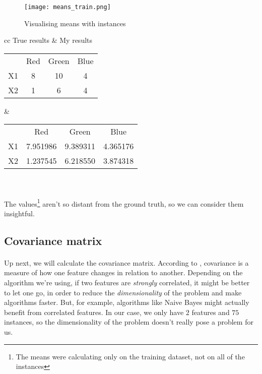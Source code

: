 \begin{figure}[H]
    \centering
    \texttt{[image: means\_train.png]}
    \caption{Visualising means with instances}
    \label{}
\end{figure}

\clearpage

\begin{center}
    \begin{tabular}{ cc }   %
        True results & My results \\  
        \begin{tabular}{ |c|c|c|c| } 
        \hline
        & Red & Green & Blue\\
        X1 & 8 & 10 & 4 \\
        X2 & 1 & 6 & 4 \\
        \hline
        \end{tabular} &  %
        \begin{tabular}{ |c|c|c|c| } 
        \hline
        & Red & Green & Blue\\
        X1 & 7.951986 & 9.389311 & 4.365176 \\
        X2 & 1.237545 & 6.218550 & 3.874318 \\
        \hline
        \end{tabular} \\
    \end{tabular}
\end{center}

\paragraph{}
The values\footnote{The means were calculating only on the training dataset, not on all of the instances} aren't so distant from the ground truth, so we can consider them insightful.

\subsection{Covariance matrix}

\paragraph{}
Up next, we will calculate the covariance matrix.
According to \cite{covariance}, covariance is a measure of how one feature changes in relation to another.
Depending on the algorithm we're using, if two features are \emph{strongly} correlated, it might be better to let one go, in order to reduce the \emph{dimensionality} of the problem and make algorithms faster.
But, for example, algorithms like Naive Bayes might actually benefit from correlated features.
In our case, we only have $2$ features and $75$ instances, so the dimensionality of the problem doesn't really pose a problem for us.

